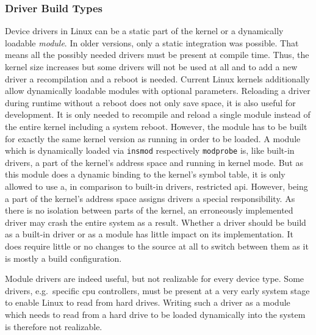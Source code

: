 \subsubsection*{Driver Build Types}
Device drivers in Linux can be a static part of the kernel or a dynamically loadable \textit{module}.
In older versions, only a static integration was possible. That means all the possibly needed drivers must be present at compile time.
Thus, the kernel size increases but some drivers will not be used at all and to add a new driver a recompilation and a reboot is needed.
Current Linux kernels additionally allow dynamically loadable modules with optional parameters.
Reloading a driver during runtime without a reboot does not only save space, it is also useful for development.
It is only needed to recompile and reload a single module instead of the entire kernel including a system reboot\cite{quade2016Linux}.
However, the module has to be built for exactly the same kernel version as running in order to be loaded.
A module which is dynamically loaded via \texttt{insmod} respectively \texttt{modprobe} is, like built-in drivers, a part of the kernel's address space and running in kernel mode.
But as this module does a dynamic binding to the kernel's symbol table, it is only allowed to use a, in comparison to built-in drivers, restricted \ac{api}\cite{glatz2015betriebssysteme}.
However, being a part of the kernel's address space assigns drivers a special responsibility.
As there is no isolation between parts of the kernel, an erroneously implemented driver may crash the entire system as a result.
Whether a driver should be build as a built-in driver or as a module has little impact on its implementation.
It does require little or no changes to the source at all to switch between them as it is mostly a build configuration\cite{lfd430}.

Module drivers are indeed useful, but not realizable for every device type.
Some drivers, e.g.\ specific \ac{cpu} controllers, must be present at a very early system stage to enable Linux to read from hard drives.
Writing such a driver as a module which needs to read from a hard drive to be loaded dynamically into the system is therefore not realizable\cite{quade2016Linux}.

